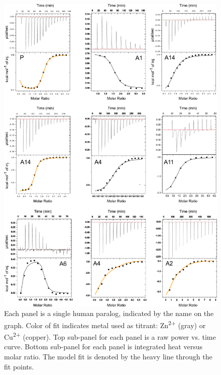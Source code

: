 \begin{figure}
\centering
	\includegraphics{ch3-S4_fig.png} 
\caption[Representative ITC data and single-site fits]{Each panel is a single human paralog, indicated by the name on the graph. Color of fit indicates metal used as titrant: Zn\textsuperscript{2+} (gray) or Cu\textsuperscript{2+} (copper). Top sub-panel for each panel is a raw power vs. time curve. Bottom sub-panel for each panel is integrated heat versus molar ratio. The model fit is denoted by the heavy line through the fit points.\label{samplefigure}}	
\end{figure}

